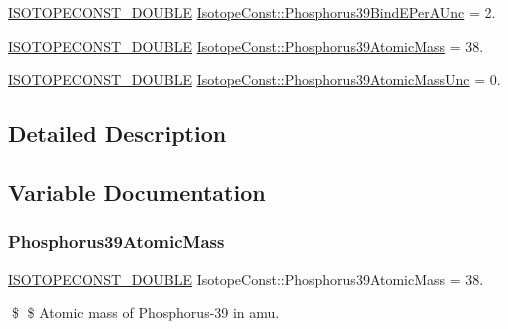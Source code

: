 \begin{DoxyCompactItemize}
\mbox{\hyperlink{group___isotope_const-_macros_ga8f45a7272ce02c0b4c65c44636ed719a}{I\+S\+O\+T\+O\+P\+E\+C\+O\+N\+S\+T\+\_\+\+D\+O\+U\+B\+LE}} \mbox{\hyperlink{group___isotope_const-_phosphorus-_p39_ga636f79f7962c509574ac59da85d37cea}{Isotope\+Const\+::\+Phosphorus39\+Bind\+E\+Per\+A\+Unc}} = 2.
\item 
\mbox{\hyperlink{group___isotope_const-_macros_ga8f45a7272ce02c0b4c65c44636ed719a}{I\+S\+O\+T\+O\+P\+E\+C\+O\+N\+S\+T\+\_\+\+D\+O\+U\+B\+LE}} \mbox{\hyperlink{group___isotope_const-_phosphorus-_p39_ga55be66a538ebe1c91a921f48e13e347b}{Isotope\+Const\+::\+Phosphorus39\+Atomic\+Mass}} = 38.
\item 
\mbox{\hyperlink{group___isotope_const-_macros_ga8f45a7272ce02c0b4c65c44636ed719a}{I\+S\+O\+T\+O\+P\+E\+C\+O\+N\+S\+T\+\_\+\+D\+O\+U\+B\+LE}} \mbox{\hyperlink{group___isotope_const-_phosphorus-_p39_ga84313de4f8225be55c87434b82500ec5}{Isotope\+Const\+::\+Phosphorus39\+Atomic\+Mass\+Unc}} = 0.
\end{DoxyCompactItemize}


\subsection{Detailed Description}


\subsection{Variable Documentation}
\mbox{\label{group___isotope_const-_phosphorus-_p39_ga55be66a538ebe1c91a921f48e13e347b}} 
\subsubsection{\texorpdfstring{Phosphorus39\+Atomic\+Mass}{Phosphorus39AtomicMass}}
{\footnotesize\ttfamily \mbox{\hyperlink{group___isotope_const-_macros_ga8f45a7272ce02c0b4c65c44636ed719a}{I\+S\+O\+T\+O\+P\+E\+C\+O\+N\+S\+T\+\_\+\+D\+O\+U\+B\+LE}} Isotope\+Const\+::\+Phosphorus39\+Atomic\+Mass = 38.}

\$ \$ Atomic mass of Phosphorus-\/39 in amu. \mbox{\label{group___isotope_const-_phosphorus-_p39_ga84313de4f8225be55c87434b82500ec5}} 
